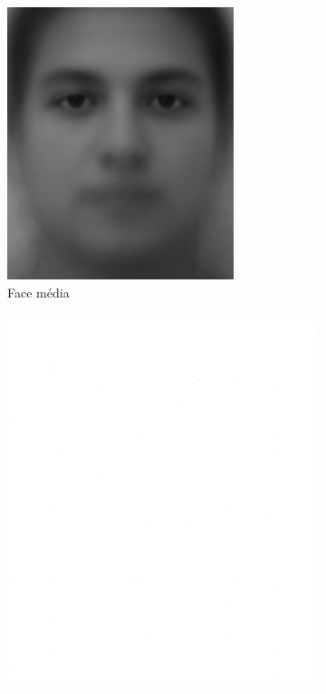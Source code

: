 \begin{figure}[htbp]
\begin{subfigure}[t]{0.3\textwidth}
    \includegraphics[width=\textwidth]{imagens/face_media.png}
    \caption{Face média}
    \end{subfigure}
    \begin{subfigure}[t]{0.3\textwidth}
    \centering
    \includegraphics[width=\textwidth]{imagens/eigenfaces.png}

\end{subfigure}
\end{figure}
